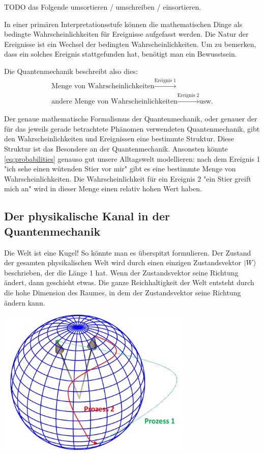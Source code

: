 \documentclass[12pt]{book}
\begin{document}
TODO das Folgende umsortieren / umschreiben / einsortieren.

In einer primären Interpretationsstufe können die mathematischen Dinge als bedingte Wahrscheinlichkeiten für Ereignisse aufgefasst werden. Die Natur der Ereignisse ist ein Wechsel der bedingten Wahrscheinlichkeiten. Um zu bemerken, dass ein solches Ereignis stattgefunden hat, benötigt man ein Bewusstsein.

Die Quantenmechanik beschreibt also dies:
\begin{equation} \label{eq:probabilities}
\begin{split}
\textrm{Menge von Wahrscheinlichkeiten} \xrightarrow{\textrm{Ereignis 1}} \\
\textrm{andere Menge von Wahrscheinlichkeiten} \xrightarrow{\textrm{Ereignis 2}}  \textrm{usw.}
\end{split}
\end{equation}

Der genaue mathematische Formalismus der Quantenmechanik, oder genauer der für das jeweils gerade betrachtete Phänomen verwendeten Quantenmechanik, gibt den Wahrscheinlichkeiten und Ereignissen eine bestimmte Struktur. Diese Struktur ist das Besondere an der Quantenmechanik. Ansonsten könnte \ref{eq:probabilities} genauso gut unsere Alltagswelt modellieren: nach dem Ereignis 1 "ich sehe einen wütenden Stier vor mir" gibt es eine bestimmte Menge von Wahrscheinlichkeiten. Die Wahrscheinlichkeit für ein Ereignis 2 "ein Stier greift mich an" wird in dieser Menge einen relativ hohen Wert haben.

\subsection{Der physikalische Kanal in der Quantenmechanik}

Die Welt ist eine Kugel! So könnte man es überspitzt formulieren. Der Zustand der gesamten physikalischen Welt wird durch einen einzigen Zustandsvektor $\ket{W}$ beschrieben, der die Länge 1 hat. Wenn der Zustandsvektor seine Richtung ändert, dann geschieht etwas. Die ganze Reichhaltigkeit der Welt entsteht durch die hohe Dimension  des Raumes, in dem der Zustandsvektor seine Richtung ändern kann. 

\begin{center}
\includegraphics[width=0.7\textwidth]{Bilder/Prozesse.png}
\end{center}
\end{document}
